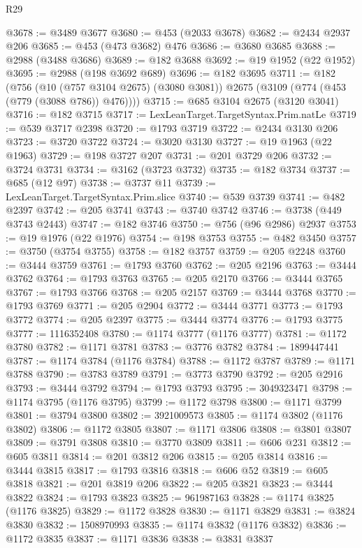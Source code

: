 \begin{lexlean}{R29}
\begin{coremodule}
@3678 := @3489 @3677
@3680 := @453 (@2033 @3678)
@3682 := @2434 @2937 @206
@3685 := @453 (@473 @3682) @476
@3686 := @3680 @3685
@3688 := @2988 (@3488 @3686)
@3689 := @182 @3688
@3692 := @19 @1952 (@22 @1952)
@3695 := @2988 (@198 @3692 @689)
@3696 := @182 @3695
@3711 := @182
    (@756
      (@10 (@757 @3104 @2675) (@3080 @3081))
      @2675
      (@3109 (@774 (@453 (@779 (@3088 @786)) @476))))
@3715 := @685 @3104 @2675 (@3120 @3041)
@3716 := @182 @3715
@3717 := LexLeanTarget.TargetSyntax.Prim.natLe
@3719 := @539 @3717 @2398
@3720 := @1793 @3719
@3722 := @2434 @3130 @206
@3723 := @3720 @3722
@3724 := @3020 @3130
@3727 := @19 @1963 (@22 @1963)
@3729 := @198 @3727 @207
@3731 := @201 @3729 @206
@3732 := @3724 @3731
@3734 := @3162 (@3723 @3732)
@3735 := @182 @3734
@3737 := @685 (@12 @97)
@3738 := @3737 @11
@3739 := LexLeanTarget.TargetSyntax.Prim.slice
@3740 := @539 @3739
@3741 := @482 @2397
@3742 := @205 @3741
@3743 := @3740 @3742
@3746 := @3738 (@449 @3743 @2443)
@3747 := @182 @3746
@3750 := @756 (@96 @2986) @2937
@3753 := @19 @1976 (@22 @1976)
@3754 := @198 @3753
@3755 := @482 @3450
@3757 := @3750 (@3754 @3755)
@3758 := @182 @3757
@3759 := @205 @2248
@3760 := @3444 @3759
@3761 := @1793 @3760
@3762 := @205 @2196
@3763 := @3444 @3762
@3764 := @1793 @3763
@3765 := @205 @2170
@3766 := @3444 @3765
@3767 := @1793 @3766
@3768 := @205 @2157
@3769 := @3444 @3768
@3770 := @1793 @3769
@3771 := @205 @2904
@3772 := @3444 @3771
@3773 := @1793 @3772
@3774 := @205 @2397
@3775 := @3444 @3774
@3776 := @1793 @3775
@3777 := 1116352408
@3780 := @1174 @3777 (@1176 @3777)
@3781 := @1172 @3780
@3782 := @1171 @3781
@3783 := @3776 @3782
@3784 := 1899447441
@3787 := @1174 @3784 (@1176 @3784)
@3788 := @1172 @3787
@3789 := @1171 @3788
@3790 := @3783 @3789
@3791 := @3773 @3790
@3792 := @205 @2916
@3793 := @3444 @3792
@3794 := @1793 @3793
@3795 := 3049323471
@3798 := @1174 @3795 (@1176 @3795)
@3799 := @1172 @3798
@3800 := @1171 @3799
@3801 := @3794 @3800
@3802 := 3921009573
@3805 := @1174 @3802 (@1176 @3802)
@3806 := @1172 @3805
@3807 := @1171 @3806
@3808 := @3801 @3807
@3809 := @3791 @3808
@3810 := @3770 @3809
@3811 := @606 @231
@3812 := @605 @3811
@3814 := @201 @3812 @206
@3815 := @205 @3814
@3816 := @3444 @3815
@3817 := @1793 @3816
@3818 := @606 @52
@3819 := @605 @3818
@3821 := @201 @3819 @206
@3822 := @205 @3821
@3823 := @3444 @3822
@3824 := @1793 @3823
@3825 := 961987163
@3828 := @1174 @3825 (@1176 @3825)
@3829 := @1172 @3828
@3830 := @1171 @3829
@3831 := @3824 @3830
@3832 := 1508970993
@3835 := @1174 @3832 (@1176 @3832)
@3836 := @1172 @3835
@3837 := @1171 @3836
@3838 := @3831 @3837

\end{coremodule}
\end{lexlean}
